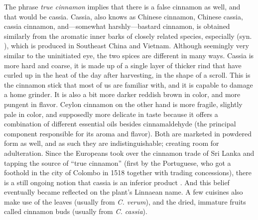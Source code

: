 The phrase \textit{true cinnamon} implies that there is a false cinnamon as well, and that would be cassia. Cassia, also knows as Chinese cinnamon, Chinese cassia, cassia cinnamon, and---somewhat harshly---bastard cinnamon, is obtained similarly from the aromatic inner barks of closely related species, especially  (syn. ), which is produced in Southeast China and Vietnam. Although seemingly very similar to the uninitiated eye, the two spices are different in many ways. Cassia is more hard and coarse, it is made up of a single layer of thicker rind that have curled up in the heat of the day after harvesting, in the shape of a scroll. This is the cinnamon stick that most of us are familiar with, and it is capable to damage a home grinder. It is also a bit more darker reddish brown in color, and more pungent in flavor. Ceylon cinnamon on the other hand is more fragile, slightly pale in color, and supposedly more delicate in taste because it offers a combination of different essential oils besides cinnamaldehyde (the principal component responsible for its aroma and flavor). Both are marketed in powdered form as well, and as such they are indistinguishable; creating room for adulteration. Since the Europeans took over the cinnamon trade of Sri Lanka and tapping the source of ``true cinnamon'' (first by the Portuguese, who got a foothold in the city of Colombo in 1518 together with trading concessions), there is a still ongoing notion that cassia is an inferior product \autocite{chennault_reclusive_2006}. And this belief eventually became reflected on the plant's Linnaean name. A few cuisines also make use of the leaves (usually from \textit{C. verum}), and the dried, immature fruits called cinnamon buds (usually from \textit{C. cassia}).



